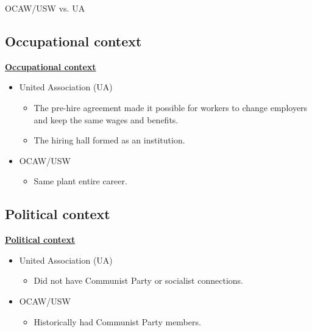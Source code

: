 \documentclass{beamer}
\begin{document}
\begin{frame}{OCAW/USW vs. UA}
\subsection*{Occupational context}
\underline{\textbf{Occupational context}}
	\begin{itemize}
		\item United Association (UA)
		\begin{itemize}
			\item The pre-hire agreement made it possible for workers to change employers and keep the same wages and benefits. %
			\item The hiring hall formed as an institution.
		\end{itemize}
		\item OCAW/USW
			\begin{itemize}
				\item Same plant entire career.
			\end{itemize}
	\end{itemize}
\subsection*{Political context}
\underline{\textbf{Political context}}
	\begin{itemize}
		\item United Association (UA)
		\begin{itemize}
			\item Did not have Communist Party or socialist connections.
		\end{itemize}
		\item OCAW/USW
			\begin{itemize}
				\item Historically had Communist Party members.
			\end{itemize}
	\end{itemize}
\end{frame}
\end{document}
